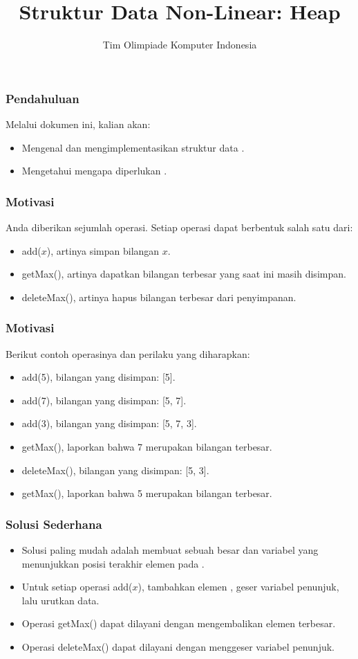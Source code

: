 

\title{Struktur Data Non-Linear: \newline Heap}
\author{Tim Olimpiade Komputer Indonesia}
\date{}



\begin{frame}
\titlepage
\end{frame}

\begin{frame}
\frametitle{Pendahuluan}
Melalui dokumen ini, kalian akan:
\begin{itemize}
  \item Mengenal dan mengimplementasikan struktur data \pheap.
  \item Mengetahui mengapa diperlukan \pheap.
\end{itemize}
\end{frame}

\begin{frame}
\frametitle{Motivasi}
Anda diberikan sejumlah operasi. Setiap operasi dapat berbentuk salah satu dari:
\begin{itemize}
  \item add($x$), artinya simpan bilangan $x$.
  \item getMax(), artinya  dapatkan bilangan terbesar yang saat ini masih disimpan.
  \item deleteMax(), artinya  hapus bilangan terbesar dari penyimpanan.
\end{itemize}
\end{frame}

\begin{frame}
\frametitle{Motivasi}
Berikut contoh operasinya dan perilaku yang diharapkan:
\begin{itemize}
  \item add(5), bilangan yang disimpan: [5].
  \item add(7), bilangan yang disimpan: [5, 7].
  \item add(3), bilangan yang disimpan: [5, 7, 3].
  \item getMax(), laporkan bahwa 7 merupakan bilangan terbesar.
  \item deleteMax(), bilangan yang disimpan: [5, 3].
  \item getMax(), laporkan bahwa 5 merupakan bilangan terbesar.
\end{itemize}
\end{frame}

\begin{frame}
\frametitle{Solusi Sederhana}
\begin{itemize}
  \item Solusi paling mudah adalah membuat sebuah \farray besar dan variabel yang menunjukkan posisi terakhir elemen pada \farray.
  \item Untuk setiap operasi add($x$), tambahkan elemen \farray, geser variabel penunjuk, lalu urutkan data. 
  \item Operasi getMax() dapat dilayani dengan mengembalikan elemen terbesar.
  \item Operasi deleteMax() dapat dilayani dengan menggeser variabel penunjuk.
\end{itemize}
\end{frame}

